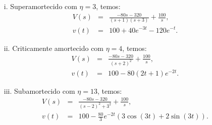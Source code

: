 \begin{itemize}
       \item[i.] Superamortecido com $\eta=3$, temos:
        \begin{eqnarray*}
              V(s) &=& \frac{-80s- 320 }{(s+1)(s+3)} +  \frac{100}{s},\\
              v(t) &=& 100 + 40 e^{-3 t} - 120 e^{-t}.
        \end{eqnarray*}
        \item[ii.] Criticamente amortecido com $\eta=4$, temos:
        \begin{eqnarray*}
              V(s) &=& \frac{-80s- 320 }{(s+2)^2} +  \frac{100}{s},\\
              v(t) &=& 100 - 80 (2t + 1) e^{-2 t}.
       \end{eqnarray*}
       \item[iii.] Subamortecido com $\eta=13$, temos:
        \begin{eqnarray*}
              V(s) &=& \frac{-80s- 320 }{(s-2)^2+3^2} +  \frac{100}{s},\\
              v(t) &=& 100 - \frac{80}{3} e^{-2 t} \left(3 \cos(3 t) + 2 \sin(3 t)\right).
        \end{eqnarray*}
\end{itemize}

